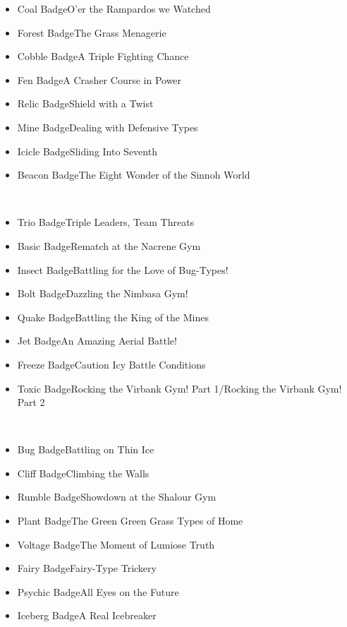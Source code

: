 \documentclass[a4paper,12pt]{article}
\begin{document}
\begin{itemize}
\item Coal BadgeO'er the Rampardos we Watched
\item Forest BadgeThe Grass Menagerie
\item Cobble BadgeA Triple Fighting Chance
\item Fen BadgeA Crasher Course in Power
\item Relic BadgeShield with a Twist
\item Mine BadgeDealing with Defensive Types
\item Icicle BadgeSliding Into Seventh
\item Beacon BadgeThe Eight Wonder of the Sinnoh World
\end{itemize}\\ \par \vspace{0.5cm}

\begin{itemize}
\item Trio BadgeTriple Leaders, Team Threats
\item Basic BadgeRematch at the Nacrene Gym
\item Insect BadgeBattling for the Love of Bug-Types!
\item Bolt BadgeDazzling the Nimbasa Gym!
\item Quake BadgeBattling the King of the Mines
\item Jet BadgeAn Amazing Aerial Battle!
\item Freeze BadgeCaution Icy Battle Conditions
\item Toxic BadgeRocking the Virbank Gym! Part 1/Rocking the Virbank Gym! Part 2
\end{itemize}\\ \par \vspace{0.5cm}

\begin{itemize}
\item Bug BadgeBattling on Thin Ice
\item Cliff BadgeClimbing the Walls
\item Rumble BadgeShowdown at the Shalour Gym
\item Plant BadgeThe Green Green Grass Types of Home
\item Voltage BadgeThe Moment of Lumiose Truth
\item Fairy BadgeFairy-Type Trickery
\item Psychic BadgeAll Eyes on the Future
\item Iceberg BadgeA Real Icebreaker
\end{itemize}\\ \par \vspace{0.5cm}
\end{document}
